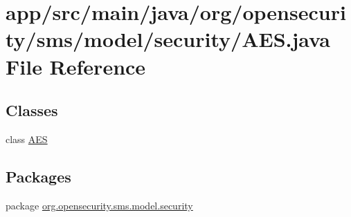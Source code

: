 \hypertarget{a00023}{\section{app/src/main/java/org/opensecurity/sms/model/security/\+A\+E\+S.java File Reference}
\label{a00023}
}
\subsection*{Classes}
\begin{DoxyCompactItemize}
\item 
class \hyperlink{a00001}{A\+E\+S}
\end{DoxyCompactItemize}
\subsection*{Packages}
\begin{DoxyCompactItemize}
\item 
package \hyperlink{a00039}{org.\+opensecurity.\+sms.\+model.\+security}
\end{DoxyCompactItemize}
